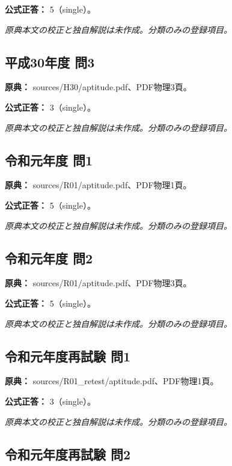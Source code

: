 \textbf{公式正答：} 5（single）。

\par\textit{原典本文の校正と独自解説は未作成。分類のみの登録項目。}

\subsection{平成30年度 問3}
\label{q:h30-reg-apt-03}

\noindent\textbf{原典：} sources/H30/aptitude.pdf、PDF物理3頁。

\textbf{公式正答：} 3（single）。

\par\textit{原典本文の校正と独自解説は未作成。分類のみの登録項目。}

\subsection{令和元年度 問1}
\label{q:r01-reg-apt-01}

\noindent\textbf{原典：} sources/R01/aptitude.pdf、PDF物理1頁。

\textbf{公式正答：} 5（single）。

\par\textit{原典本文の校正と独自解説は未作成。分類のみの登録項目。}

\subsection{令和元年度 問2}
\label{q:r01-reg-apt-02}

\noindent\textbf{原典：} sources/R01/aptitude.pdf、PDF物理3頁。

\textbf{公式正答：} 5（single）。

\par\textit{原典本文の校正と独自解説は未作成。分類のみの登録項目。}

\subsection{令和元年度再試験 問1}
\label{q:r01-ret-apt-01}

\noindent\textbf{原典：} sources/R01\_retest/aptitude.pdf、PDF物理1頁。

\textbf{公式正答：} 3（single）。

\par\textit{原典本文の校正と独自解説は未作成。分類のみの登録項目。}

\subsection{令和元年度再試験 問2}
\label{q:r01-ret-apt-02}

